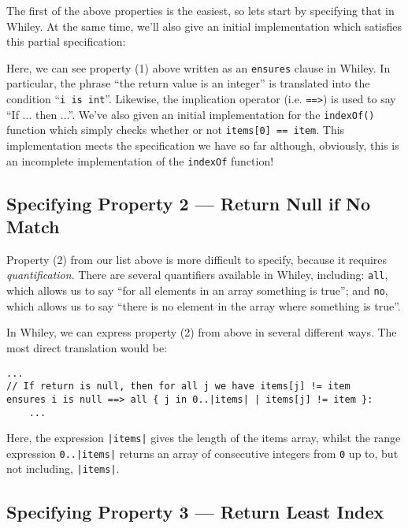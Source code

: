 The first of the above properties is the easiest, so lets start by
specifying that in Whiley.  At the same time, we'll also give an
initial implementation which satisfies this partial specification:



Here, we can see property (1) above written as an \lstinline{ensures}
clause in Whiley.  In particular, the phrase ``the return value is an
integer'' is translated into the condition ``\lstinline{i is int}''.
Likewise, the implication operator (i.e. \lstinline{==>}) is used to
say ``If ... then ...''.  We've also given an initial implementation
for the \lstinline{indexOf()} function which simply checks whether or
not \lstinline{items[0] == item}.  This implementation meets the
specification we have so far although, obviously, this is an
incomplete implementation of the \lstinline{indexOf} function!

\subsection{Specifying Property 2 --- Return Null if No Match}
Property (2) from our list above is more difficult to specify, because
it requires {\em quantification}.  There are several quantifiers
available in Whiley, including: \lstinline{all}, which allows us to
say ``for all elements in an array something is true''; and
\lstinline{no}, which allows us to say ``there is no element in the array
where something is true''. 

In Whiley, we can express property (2) from above in several different
ways.  The most direct translation would be:

\begin{lstlisting}
...
// If return is null, then for all j we have items[j] != item
ensures i is null ==> all { j in 0..|items| | items[j] != item }:
    ...
\end{lstlisting}

\noindent Here, the expression \lstinline{|items|} gives the length of
the items array, whilst the range expression \lstinline{0..|items|}
returns an array of consecutive integers from \lstinline{0} up to, but
not including, \lstinline{|items|}.

\subsection{Specifying Property 3 --- Return Least Index}

